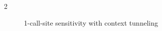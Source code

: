 \begin{figure*}[t]
\begin{multicols}{2}
\begin{subfigure}[b]{1.0\columnwidth}
\begin{center}
{
				}
			\end{center}
			\vspace{-4pt}
			\caption[]{1-call-site sensitivity with context tunneling}
			\label{back:callT:callgraph}
\end{subfigure}





\end{multicols}
					
					
					
					
					
					

\end{figure*}
